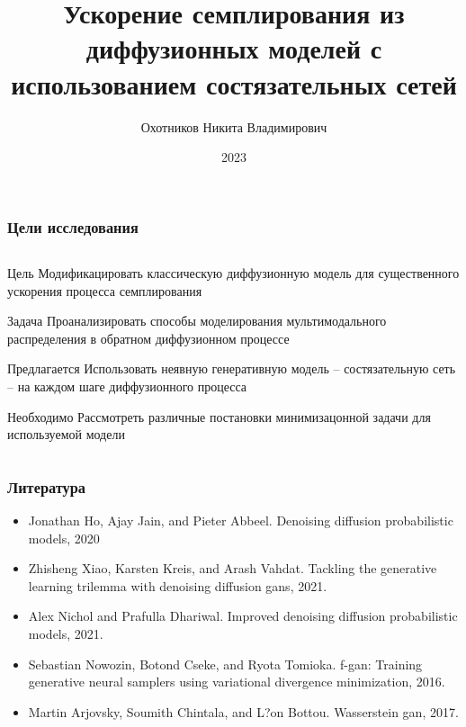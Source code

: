 \documentclass[8pt]{beamer}
\title[]{Ускорение семплирования из диффузионных моделей с использованием состязательных сетей}
\author{Охотников Никита Владимирович}
\institute{МФТИ}
\date{2023}
\newcommand\FontUP{\fontsize{10}{12}\selectfont}
\begin{document}
{
\begin{frame}
  \titlepage
\end{frame}
}

\begin{frame}
	\frametitle{Цели исследования}
	
	\begin{columns}
		\begin{column}{0.9\textwidth}
	
			\begin{block}{Цель}
				\smallskip
			Модификацировать классическую диффузионную модель для существенного ускорения процесса семплирования
			\end{block}	
		
			\bigskip
		
			\begin{block}{Задача}
					\smallskip
				Проанализировать способы моделирования мультимодального распределения в обратном диффузионном процессе
			\end{block}	
		
			\bigskip
			
			\begin{block}{Предлагается}
				\smallskip
				Использовать неявную генеративную модель -- состязательную сеть -- на каждом шаге диффузионного процесса
			\end{block}	
		
			\bigskip
		
			\begin{block}{Необходимо}
				\smallskip
				Рассмотреть различные постановки минимизацонной задачи для используемой модели
			\end{block}	

	     \end{column}
	\end{columns}


\end{frame}

\begin{frame}
	\frametitle{Литература}
	\FontUP
	\begin{itemize}
		\item Jonathan Ho, Ajay Jain, and Pieter Abbeel. Denoising diffusion probabilistic models, 2020
		\medskip
		\item Zhisheng Xiao, Karsten Kreis, and Arash Vahdat. Tackling the generative learning trilemma with denoising diffusion gans, 2021.
		\medskip
		\item Alex Nichol and Prafulla Dhariwal. Improved denoising diffusion probabilistic models, 2021.
		\medskip
		\item Sebastian Nowozin, Botond Cseke, and Ryota Tomioka. f-gan: Training generative neural samplers using
		variational divergence minimization, 2016.
		\medskip
		\item Martin Arjovsky, Soumith Chintala, and L?on Bottou. Wasserstein gan, 2017.
	\end{itemize}
	
\end{frame}
\end{document}
